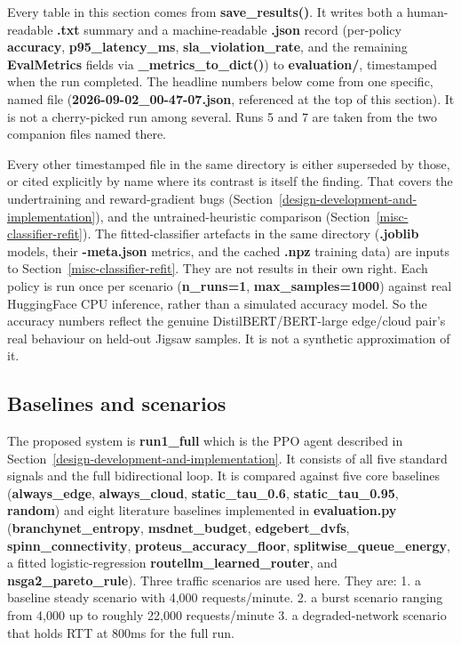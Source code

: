 Every table in this section comes from \textbf{save\_results()}. It
writes both a human-readable \textbf{.txt} summary and a
machine-readable \textbf{.json} record (per-policy \textbf{accuracy},
\textbf{p95\_latency\_ms}, \textbf{sla\_violation\_rate}, and the
remaining \textbf{EvalMetrics} fields via
\textbf{\_metrics\_to\_dict()}) to \textbf{evaluation/}, timestamped
when the run completed. The headline numbers below come from one
specific, named file (\textbf{2026-09-02\_00-47-07.json}, referenced at
the top of this section). It is not a cherry-picked run among several. Runs
5 and 7 are taken from the two companion files named there.

Every other timestamped file in the same directory is either
superseded by those, or cited explicitly by name where its contrast is
itself the finding. That covers the undertraining and reward-gradient
bugs (Section~\ref{design-development-and-implementation}), and the untrained-heuristic comparison (Section~\ref{misc-classifier-refit}). The fitted-classifier artefacts in the same directory
(\textbf{.joblib} models, their \textbf{-meta.json} metrics, and the
cached \textbf{.npz} training data) are inputs to Section~\ref{misc-classifier-refit}.
They are not results in their own right. Each policy is run once per scenario
(\textbf{n\_runs=1}, \textbf{max\_samples=1000}) against real
HuggingFace CPU inference, rather than a simulated accuracy model. So the
accuracy numbers reflect the genuine DistilBERT/BERT-large edge/cloud
pair's real behaviour on held-out Jigsaw samples. It is not a
synthetic approximation of it.

\hypertarget{baselines-and-scenarios}{%
\subsection{Baselines and scenarios}\label{baselines-and-scenarios}}

The proposed system is \textbf{run1\_full} which is the PPO agent described in
Section~\ref{design-development-and-implementation}. It consists of all five standard signals and the full bidirectional
loop. It is compared against five core baselines
(\textbf{always\_edge}, \textbf{always\_cloud},
\textbf{static\_tau\_0.6}, \textbf{static\_tau\_0.95},
\textbf{random}) and eight literature baselines implemented in
\textbf{evaluation.py} (\textbf{branchynet\_\-entropy},
\textbf{msdnet\_\-budget}, \textbf{edgebert\_\-dvfs},
\textbf{spinn\_\-connectivity}, \textbf{proteus\_\-accuracy\_\-floor},
\textbf{splitwise\_\-queue\_\-energy}, a fitted
logistic-regression \textbf{routellm\_\-learned\_\-router}, and
\textbf{nsga2\_\-pareto\_\-rule}). Three traffic scenarios are used here. They are:
1. a baseline steady scenario with 4,000 requests/minute.
2. a burst scenario ranging from 4,000 up to roughly 22,000 requests/minute
3. a degraded-network scenario that holds RTT at 800ms for the full run.


